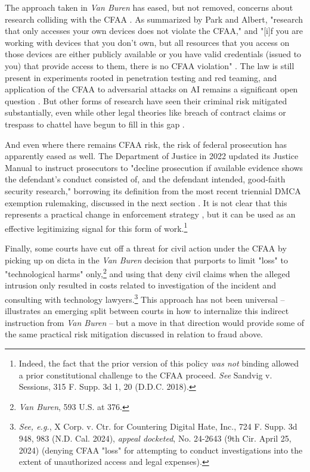 The approach taken in \textit{Van Buren} has eased, but not removed, concerns about research colliding with the CFAA \cite{bhandari2024}. As summarized by Park and Albert, "research that only accesses your own devices does not violate the CFAA," and "[i]f you are working with devices that you don't own, but all resources that you access on those devices are either publicly available or you have valid credentials (issued to you) that provide access to them, there is no CFAA violation" \cite{parkResearchersGuideLegal}. The law is still present in experiments rooted in penetration testing and red teaming, and application of the CFAA to adversarial attacks on AI remains a significant open question \cite{albert_ignore_2024}. But other forms of research have seen their criminal risk mitigated substantially, even while other legal theories like breach of contract claims or trespass to chattel have begun to fill in this gap \cite{sobel2021}.

And even where there remains CFAA risk, the risk of federal prosecution has apparently eased as well. The Department of Justice in 2022 updated its Justice Manual to instruct prosecutors to "decline prosecution if available evidence shows the defendant's conduct consisted of, and the defendant intended, good-faith security research," borrowing its definition from the most recent triennial DMCA exemption rulemaking, discussed in the next section \cite{OfficePublicAffairs2022}. It is not clear that this represents a practical change in enforcement strategy \cite{pfefferkorn2022}, but it can be used as an effective legitimizing signal for this form of work.\footnote{Indeed, the fact that the prior version of this policy \textit{was not} binding allowed a prior constitutional challenge to the CFAA proceed. \textit{See} Sandvig v. Sessions, 315 F. Supp. 3d 1, 20 (D.D.C. 2018).} 

Finally, some courts have cut off a threat for civil action under the CFAA by picking up on dicta in the \textit{Van Buren} decision that purports to limit "loss" to "technological harms" only,\footnote{\textit{Van Buren}, 593 U.S. at 376.} and using that deny civil claims when the alleged intrusion only resulted in costs related to investigation of the incident and consulting with technology lawyers.\footnote{\textit{See, e.g.}, X Corp. v. Ctr. for Countering Digital Hate, Inc., 724 F. Supp. 3d 948, 983 (N.D. Cal. 2024), \textit{appeal docketed}, No. 24-2643 (9th Cir. April 25, 2024) (denying CFAA "loss" for attempting to conduct investigations into the extent of unauthorized access and legal expenses).} This approach has not been universal -- \cite{pfefferkorn2022} illustrates an emerging split between courts in how to internalize this indirect instruction from \textit{Van Buren} -- but a move in that direction would provide some of the same practical risk mitigation discussed in relation to fraud above.

